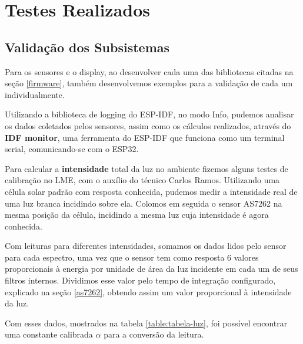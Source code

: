 \documentclass[../monografia.tex]{subfiles}
\begin{document}

\section{Testes Realizados} %

\subsection{Validação dos Subsistemas} %

Para os sensores e o display, ao desenvolver cada uma das bibliotecas citadas na seção \ref{firmware}, também desenvolvemos exemplos para a validação de cada um individualmente. 

Utilizando a biblioteca de logging do ESP-IDF\cite{log-esp}, no modo Info, pudemos analisar os dados coletados pelos sensores, assim como os cálculos realizados, através do \textbf{IDF monitor}, uma ferramenta do ESP-IDF que funciona como um terminal serial, comunicando-se com o ESP32. 

Para calcular a \textbf{intensidade} total da luz no ambiente fizemos alguns testes de calibração no LME, com o auxílio do técnico Carlos Ramos. Utilizando uma célula solar padrão com resposta conhecida, pudemos medir a intensidade real de uma luz branca incidindo sobre ela. Colomos em seguida o sensor AS7262 na mesma posição da célula, incidindo a mesma luz cuja intensidade é agora conhecida. 

Com leituras para diferentes intensidades, somamos os dados lidos pelo sensor para cada espectro, uma vez que o sensor tem como resposta 6 valores proporcionais à energia por unidade de área da luz incidente em cada um de seus filtros internos. 
Dividimos esse valor pelo tempo de integração configurado, explicado na seção \ref{as7262}, obtendo assim um valor proporcional à intensidade da luz. 	

Com esses dados, mostrados na tabela \ref{table:tabela-luz}, foi possível encontrar uma constante calibrada $\alpha$  para a conversão da leitura. \newpage
\end{document}
